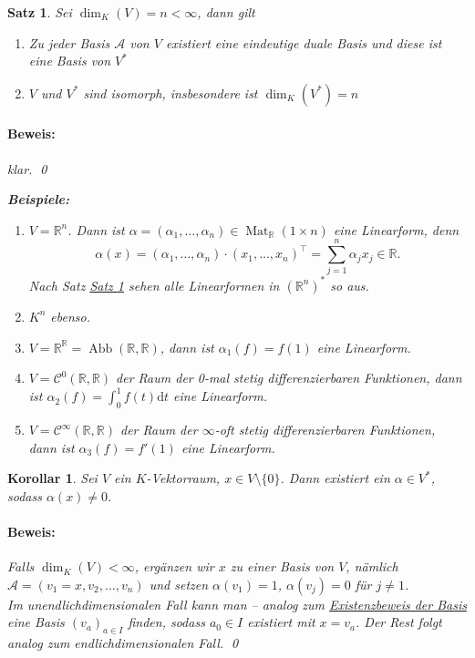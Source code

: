 \documentclass{report}
\newcommand{\R}{\mathbb{R}}
\newcommand{\al}{\alpha}
\newcommand{\basea}{\mathcal{A}}
\DeclareMathOperator{\abb}{Abb}
\DeclareMathOperator{\Mat}{Mat}
\theoremstyle{customrem}
\theoremstyle{customdef}
\newtheorem{korrolar}[definition]{Korollar}
\newtheorem{satz}[definition]{Satz}
\renewenvironment{proof}{\paragraph{Beweis: }}{\qed}
\theoremstyle{customenv}
\begin{document}
	\begin{satz}
		\label{satz52}
		Sei \(\dim_K(V)=n<\infty\), dann gilt
		\begin{enumerate}[label=\roman*)]
			\item Zu jeder Basis \(\basea\) von \(V\) existiert eine eindeutige duale Basis und diese ist eine Basis von \(V^\ast\)
			\item \(V\) und \(V^\ast\) sind isomorph, insbesondere ist \(\dim_K(V^\ast)=n\)
		\end{enumerate}
		\begin{proof}
			klar.
		\end{proof}
		
		\vspace{.2cm}
		\textbf{Beispiele:}
		\begin{enumerate}[label=\roman*)]
			\item \(V=\R^n\). Dann ist \(\al=(\al_1,\ldots, \al_n)\in\Mat_\R(1\times n)\) eine Linearform, denn \[\al(x)=(\al_1,\ldots, \al_n)\cdot(x_1,\ldots, x_n)^\top = \sum_{j=1}^{n}\al_jx_j\in\R.\] Nach Satz \hyperref[satz52]{Satz \ref*{satz52}} sehen alle Linearformen in \((\R^n)^\ast\) so aus.
			\item \(K^n\) ebenso.
			\item \(V=\R^\R=\abb(\R, \R)\), dann ist \(\al_1(f)=f(1)\) eine Linearform.
			\item \(V=\mathcal{C}^0(\R, \R)\) der Raum der 0-mal stetig differenzierbaren Funktionen, dann ist \(\al_2(f)=\int_0^1f(t)\mathrm{d}t\) eine Linearform.
			\item \(V=\mathcal{C}^\infty(\R, \R)\) der Raum der \(\infty\)-oft stetig differenzierbaren Funktionen, dann ist \(\al_3(f)=f'(1)\) eine Linearform.
		\end{enumerate}
	\end{satz}
	\pagebreak[4]
	\begin{korrolar}
		\label{kor53}
		Sei \(V\) ein \(K\)-Vektorraum, \(x\in V\setminus\{0\}\). Dann existiert ein \(\al\in V^\ast\), sodass \(\al(x)\neq 0\).
		\begin{proof}
			Falls \(\dim_K(V)<\infty\), ergänzen wir \(x\) zu einer Basis von \(V\), nämlich \(\basea=(v_1=x, v_2,\ldots, v_n)\) und setzen \(\al(v_1)=1\), \(\al(v_j)=0\) für \(j\neq 1\).\\
			
			Im unendlichdimensionalen Fall kann man -- analog zum \hyperref[satz220]{Existenzbeweis der Basis} eine Basis \((v_a)_{a\in I}\) finden, sodass \(a_0\in I\) existiert mit \(x=v_a\). Der Rest folgt analog zum endlichdimensionalen Fall. 
		\end{proof}
	\end{korrolar}
	
\end{document}
